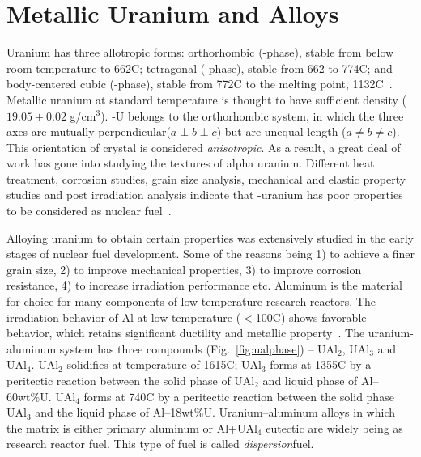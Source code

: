 \section{Metallic Uranium and Alloys}
Uranium has three allotropic forms: orthorhombic (\textalpha-phase), stable from below room temperature to 662\textdegree C; tetragonal (\textbeta-phase), stable from 662 to 774\textdegree C; and body-centered cubic (\textgamma-phase), stable from 772\textdegree C to the melting point, 1132\textdegree C~\cite{kaufmann1962nuclear}. Metallic uranium at standard temperature is thought to have sufficient density ($19.05\pm0.02$ g/cm$^3$). \textalpha-U belongs to the orthorhombic system, in which the three axes are mutually perpendicular($a\perp b\perp c$) but are unequal length ($a\ne b\ne c$). This orientation of crystal is considered \textit{anisotropic}. As a result, a great deal of work has gone into studying the textures of alpha uranium. Different heat treatment, corrosion studies, grain size analysis, mechanical and elastic property studies and post irradiation analysis indicate that \textalpha-uranium has poor properties to be considered as nuclear fuel~\cite{pugh1961swelling, loomis1962swelling, chiswik1958osti}.

Alloying uranium to obtain certain properties was extensively studied in the early stages of nuclear fuel development. Some of the reasons being 1) to achieve a finer grain size, 2) to improve mechanical properties, 3) to improve corrosion resistance, 4) to increase irradiation performance etc. Aluminum is the material for choice for many components of low-temperature research reactors. The irradiation behavior of Al at low temperature ($<$100\textdegree C) shows favorable behavior, which retains significant ductility and metallic property~\cite{farrell2012}. The uranium-aluminum system has three compounds (Fig.~\ref{fig:ualphase}) -- UAl$_2$, UAl$_3$ and UAl$_4$. UAl$_2$ solidifies at temperature of 1615\textdegree C; UAl$_3$ forms at 1355\textdegree C by a peritectic reaction between the solid phase of UAl$_2$ and liquid phase of Al--60wt\%U. UAl$_4$ forms at 740\textdegree C by a peritectic reaction between the solid phase UAl$_3$ and the liquid phase of Al--18wt\%U. Uranium--aluminum alloys in which the matrix is either primary aluminum or Al+UAl$_4$ eutectic are widely being as research reactor fuel. This type of fuel is called \textit{dispersion}\footnotemark\@ fuel.


